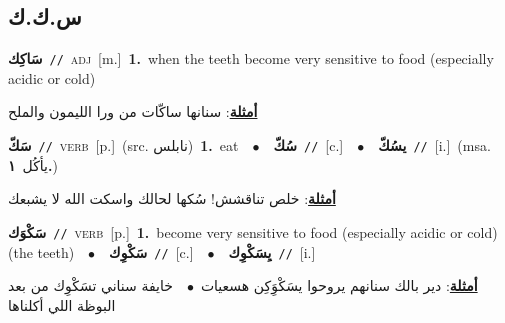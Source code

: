 \documentclass[10pt,a4paper,twoside]{article} %
\begin{document}
\begin{multicols}{2}
\vspace{-3mm}
\subsection*{\color{blue}\foreignlanguage{arabic}{س.ك.ك}\color{blue}{}} 

{\setlength\topsep{0pt}\textbf{\foreignlanguage{arabic}{سَاكِك}}\ {\color{gray}\texttt{//}\color{black}}\ \textsc{adj}\ [m.]\ \textbf{1.}~when the teeth become very sensitive to food (especially acidic or cold)\  \begin{flushright}\color{gray}\foreignlanguage{arabic}{\textbf{\underline{\foreignlanguage{arabic}{أمثلة}}}: سنانها ساكّات من ورا الليمون والملح}\end{flushright}\color{black}} \vspace{2mm}

{\setlength\topsep{0pt}\textbf{\foreignlanguage{arabic}{سَكّ}}\ {\color{gray}\texttt{//}\color{black}}\ \textsc{verb}\ [p.]\ (src. \color{gray}\foreignlanguage{arabic}{نابلس}\color{black})\ \textbf{1.}~eat\ \ $\bullet$\ \ \setlength\topsep{0pt}\textbf{\foreignlanguage{arabic}{سُكّ}}\ {\color{gray}\texttt{//}\color{black}}\ [c.]\ \ $\bullet$\ \ \setlength\topsep{0pt}\textbf{\foreignlanguage{arabic}{يسُكّ}}\ {\color{gray}\texttt{//}\color{black}}\ [i.]\ \color{gray}(msa. \foreignlanguage{arabic}{يأكُل}~\foreignlanguage{arabic}{\textbf{١.}})\color{black}\  \begin{flushright}\color{gray}\foreignlanguage{arabic}{\textbf{\underline{\foreignlanguage{arabic}{أمثلة}}}: خلص تناقشش! سُكها لحالك واسكت الله لا يشبعك}\end{flushright}\color{black}} \vspace{2mm}

{\setlength\topsep{0pt}\textbf{\foreignlanguage{arabic}{سَكْوَك}}\ {\color{gray}\texttt{//}\color{black}}\ \textsc{verb}\ [p.]\ \textbf{1.}~become very sensitive to food (especially acidic or cold) (the teeth)\ \ $\bullet$\ \ \setlength\topsep{0pt}\textbf{\foreignlanguage{arabic}{سَكْوِك}}\ {\color{gray}\texttt{//}\color{black}}\ [c.]\ \ $\bullet$\ \ \setlength\topsep{0pt}\textbf{\foreignlanguage{arabic}{يِسَكْوِك}}\ {\color{gray}\texttt{//}\color{black}}\ [i.]\  \begin{flushright}\color{gray}\foreignlanguage{arabic}{\textbf{\underline{\foreignlanguage{arabic}{أمثلة}}}: دير بالك سنانهم يروحوا يسَكْوَِكِن هسعيات\ $\bullet$\ \  خايفة سناني تسَكْوِك من بعد البوظة اللي أكلناها}\end{flushright}\color{black}} \vspace{2mm}


\end{multicols}
\end{document}
